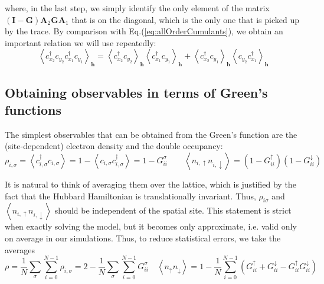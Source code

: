 where, in the last step, we simply identify the only element of the matrix  $( \bm I - \bm G ) \bm A_2 \bm G \bm A_1$ that is on the diagonal, which is the only one that is picked up by the trace.
By comparison with Eq.(\ref{eq:allOrderCumulants}), we obtain an important relation we will use repeatedly:
\begin{equation}
\left\langle c_{x_2}^\dagger c_{y_2} c_{x_1}^\dagger c_{y_1} \right\rangle_{\bm h} = \left\langle c_{x_2}^\dagger c_{y_2} \right\rangle_{\bm h} \left\langle c_{x_1}^\dagger c_{y_1} \right\rangle_{\bm h} + \left\langle c_{x_2}^\dagger c_{y_1} \right\rangle_{\bm h} \left\langle  c_{y_2} c_{x_1}^\dagger \right\rangle_{\bm h}
\end{equation}

\subsection{Obtaining observables in terms of Green's functions}
\label{subsec:observablesGreen}

The simplest observables that can be obtained from the Green's function are the (site-dependent) electron density and the double occupancy:
\begin{equation}
\rho_{i, \sigma} = \left\langle c_{i,\sigma}^\dagger c_{i,\sigma} \right\rangle = 1 - \left\langle c_{i,\sigma} c_{i,\sigma}^\dagger \right\rangle = 1 - G_{ii}^\sigma  \quad\quad \left\langle n_{i,\uparrow} n_{i,\downarrow} \right\rangle = ( 1 - G_{ii}^\uparrow ) ( 1 - G_{ii}^\downarrow )
\end{equation}

It is natural to think of averaging them over the lattice, which is justified by the fact that the Hubbard Hamiltonian is translationally invariant.
Thus, $\rho_{i\sigma}$ and $\left\langle n_{i,\uparrow} n_{i,\downarrow} \right\rangle$ should be independent of the spatial site.
This statement is strict when exactly solving the model, but it becomes only approximate, i.e. valid only on average in our simulations.
Thus, to reduce statistical errors, we take the averages
\begin{equation}
\rho = \frac{1}{N} \sum_\sigma \sum_{i=0}^{N-1} \rho_{i, \sigma} = 2 - \frac{1}{N} \sum_\sigma \sum_{i=0}^{N-1} G_{ii}^\sigma \quad \left\langle n_\uparrow n_\downarrow \right\rangle = 1 - \frac{1}{N} \sum_{i=0}^{N-1} ( G_{ii}^\uparrow + G_{ii}^\downarrow - G_{ii}^\uparrow G_{ii}^\downarrow )
\end{equation}


